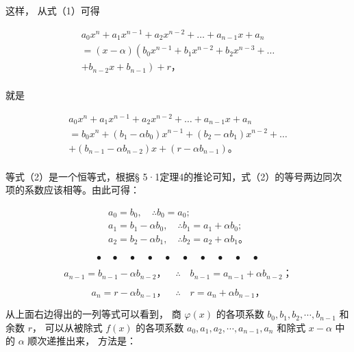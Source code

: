 这样， 从式（1）可得

\[
\begin{array}{l} a _ {0} x ^ {n} + a _ {1} x ^ {n - 1} + a _ {2} x ^ {n - 2} + \dots + a _ {n - 1} x + a _ {n} \\ = (x - \alpha) \left(b _ {0} x ^ {n - 1} + b _ {1} x ^ {n - 2} + b _ {2} x ^ {n - 3} + \dots \right. \\ \left. + b _ {n - 2} x + b _ {n - 1}\right) + r\text{，} \\ \end{array}
\]

就是

\[
\begin{array}{l} a _ {0} x ^ {n} + a _ {1} x ^ {n - 1} + a _ {2} x ^ {n - 2} + \dots + a _ {n - 1} x + a _ {n} \\ = b _ {0} x ^ {n} + \left(b _ {1} - \alpha b _ {0}\right) x ^ {n - 1} + \left(b _ {2} - \alpha b _ {1}\right) x ^ {n - 2} + \dots \\ + \left(b _ {n - 1} - \alpha b _ {n - 2}\right) x + \left(r - \alpha b _ {n - 1}\right)\text{。} \tag {2} \\ \end{array}
\]

等式（2）是一个恒等式，根据§
5·1定理4的推论可知，式（2）的等号两边同次项的系数应该相等。由此可得：

\[
\begin{array}{l}
a_0=b_0,\quad \therefore b_0=a_0;\\
a_1=b_1-\alpha b_0,\quad \therefore b_1=a_1+\alpha b_0;\\
a_2=b_2-\alpha b_1,\quad \therefore b_2=a_2+\alpha b_1\text{。}
\end{array}
\]

\[
\bullet \quad \bullet \quad \bullet \quad \bullet \quad \bullet \quad \bullet \quad \bullet \quad \bullet \quad \bullet \quad \bullet \tag {1.1}
\]

\[
a _ {n - 1} = b _ {n - 1} - \alpha b _ {n - 2}\text{，} \quad \therefore \quad b _ {n - 1} = a _ {n - 1} + \alpha b _ {n - 2}\text{；}
\]

\[
a _ {n} = r - \alpha b _ {n - 1}\text{，} \quad \therefore \quad r = a _ {n} + \alpha b _ {n - 1}\text{，}
\]

从上面右边得出的一列等式可以看到， 商 \(\varphi(x)\) 的各项系数
\(b_{0}, b_{1}, b_{2}, \cdots, b_{n-1}\) 和余数 \(r\)， 可以从被除式
\(f(x)\) 的各项系数 \(a_{0}, a_{1}, a_{2}, \cdots, a_{n-1}, a_{n}\)
和除式 \(x - \alpha\) 中的 \(\alpha\) 顺次递推出来， 方法是：

